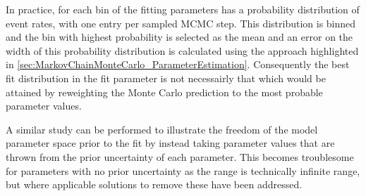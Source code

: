 In practice, for each bin of the fitting parameters has a probability distribution of event rates, with one entry per sampled MCMC step. This distribution is binned and the bin with highest probability is selected as the mean and an error on the width of this probability distribution is calculated using the approach highlighted in \autoref{sec:MarkovChainMonteCarlo_ParameterEstimation}. Consequently the best fit distribution in the fit parameter is not necessairly that which would be attained by reweighting the Monte Carlo prediction to the most probable parameter values.

A similar study can be performed to illustrate the freedom of the model parameter space prior to the fit by instead taking parameter values that are thrown from the prior uncertainty of each parameter. This becomes troublesome for parameters with no prior uncertainty as the range is technically infinite range, but where applicable solutions to remove these have been addressed.
